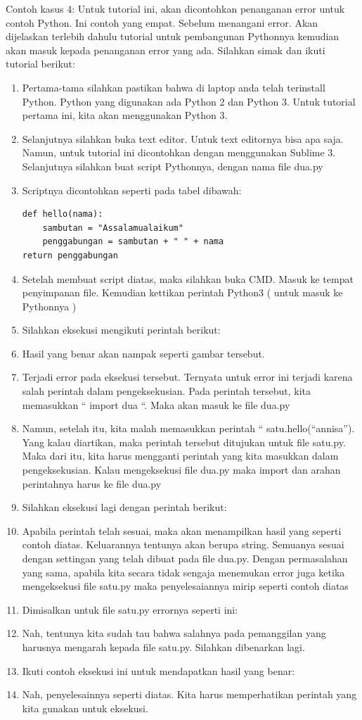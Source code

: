 Contoh kasus 4: Untuk tutorial ini, akan dicontohkan penanganan error untuk contoh Python. Ini contoh yang empat. Sebelum menangani error. Akan dijelaskan terlebih dahulu tutorial untuk pembangunan Pythonnya kemudian akan masuk kepada penanganan error yang ada. Silahkan simak dan ikuti tutorial berikut: 
\begin{enumerate}
\item Pertama-tama silahkan pastikan bahwa di laptop anda telah terinstall Python. Python yang digunakan ada Python 2 dan Python 3. Untuk tutorial pertama ini, kita akan menggunakan Python 3.
\item Selanjutnya silahkan buka text editor. Untuk text editornya bisa apa saja. Namun, untuk tutorial ini dicontohkan dengan menggunakan Sublime 3. Selanjutnya silahkan buat script Pythonnya, dengan nama file dua.py
\item Scriptnya dicontohkan seperti pada tabel dibawah:
\begin{verbatim}
def hello(nama):
	sambutan = "Assalamualaikum"
	penggabungan = sambutan + " " + nama
return penggabungan
\end{verbatim}
\item Setelah membuat script diatas, maka silahkan buka CMD. Masuk ke tempat penyimpanan file. Kemudian kettikan perintah Python3 ( untuk masuk ke Pythonnya )
\item Silahkan eksekusi mengikuti perintah berikut:
\item Hasil yang benar akan nampak seperti gambar tersebut.
\item Terjadi error pada eksekusi tersebut. Ternyata untuk error ini terjadi karena salah perintah dalam pengeksekusian. Pada perintah tersebut, kita memasukkan “ import dua “. Maka akan masuk ke file dua.py
\item Namun, setelah itu, kita malah memasukkan perintah “ satu.hello(“annisa”). Yang kalau diartikan, maka perintah tersebut ditujukan untuk file satu.py. Maka dari itu, kita harus mengganti perintah yang kita masukkan dalam pengeksekusian. Kalau mengeksekusi file dua.py maka import dan arahan perintahnya harus ke file dua.py
\item Silahkan eksekusi lagi dengan perintah berikut:
\item Apabila perintah telah sesuai, maka akan menampilkan hasil yang seperti contoh diatas. Keluarannya tentunya akan berupa string. Semuanya sesuai dengan settingan yang telah dibuat pada file dua.py. Dengan permasalahan yang sama, apabila kita secara tidak sengaja menemukan error juga ketika mengeksekusi file satu.py maka penyelesaiannya mirip seperti contoh diatas
\item Dimisalkan untuk file satu.py errornya seperti ini:
\item Nah, tentunya kita sudah tau bahwa salahnya pada pemanggilan yang harusnya mengarah kepada file satu.py. Silahkan dibenarkan lagi.
\item Ikuti contoh eksekusi ini untuk mendapatkan hasil yang benar:
\item Nah, penyelesainnya seperti diatas. Kita harus memperhatikan perintah yang kita gunakan untuk eksekusi.
\end{enumerate}